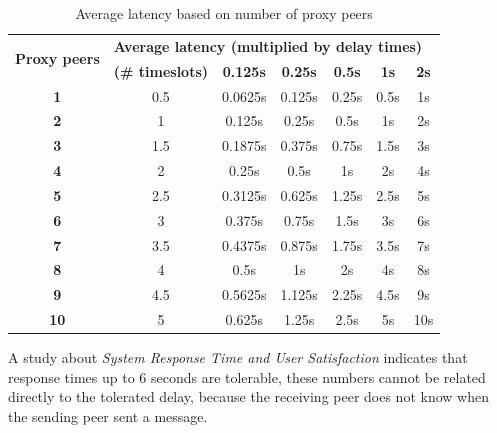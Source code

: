 \begin{longtable}{|c|c|c|c|c|c|c|}
\caption{Average latency based on number of proxy peers}
\label{avglatencypeers}\\
\hline
\multirow{2}{*}{\textbf{Proxy peers}} & \multicolumn{6}{|l|}{\textbf{Average latency (multiplied by delay times)}} \\
& \textbf{(\# timeslots)} & \textbf{0.125s} & \textbf{0.25s} & \textbf{0.5s} & \textbf{1s} & \textbf{2s}\\
\hline
\textbf{1} & 0.5 & 0.0625s & 0.125s & 0.25s & 0.5s & 1s\\
\hline
\textbf{2} & 1 & 0.125s & 0.25s & 0.5s & 1s & 2s\\
\hline
\textbf{3} & 1.5 & 0.1875s & 0.375s & 0.75s & 1.5s & 3s\\
\hline
\textbf{4} & 2 & 0.25s & 0.5s & 1s & 2s & 4s\\
\hline
\textbf{5} & 2.5 & 0.3125s & 0.625s & 1.25s & 2.5s & 5s\\
\hline
\textbf{6} & 3 & 0.375s & 0.75s & 1.5s & 3s & 6s\\
\hline
\textbf{7} & 3.5 & 0.4375s & 0.875s & 1.75s & 3.5s & 7s\\
\hline
\textbf{8} & 4 & 0.5s & 1s & 2s & 4s & 8s\\
\hline
\textbf{9} & 4.5 & 0.5625s & 1.125s & 2.25s & 4.5s & 9s\\
\hline
\textbf{10} & 5 & 0.625s & 1.25s & 2.5s & 5s & 10s\\
\hline
\end{longtable}
A study about 
\textit{System Response Time and User Satisfaction}\cite{responsetime}
indicates that response times up to 6 seconds are tolerable, these numbers
cannot be related directly to the tolerated delay, because the receiving
peer does not know when the sending peer sent a message.
